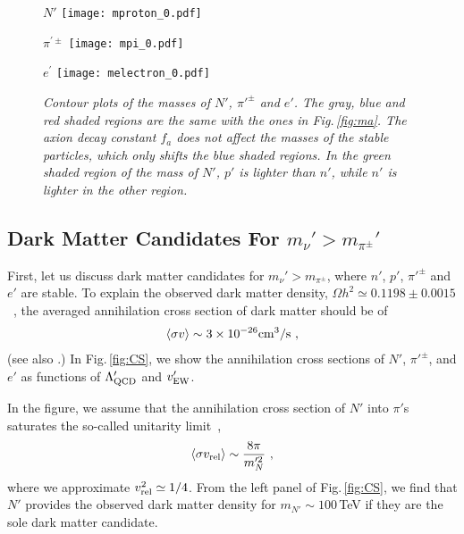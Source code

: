 \documentclass[aps,amsmath,preprint,epsf,superscriptaddress,nofootinbib,notitlepage]{revtex4-1}
\begin{document}
\begin{figure}[t]
\begin{center}
\begin{minipage}{.325\linewidth}
{\sl \small $N'$}  
\texttt{[image: mproton\_0.pdf]}
 \end{minipage}
 \begin{minipage}{.325\linewidth}
 {\sl \small $\pi^{\prime\pm}$}  
  \texttt{[image: mpi\_0.pdf]}
 \end{minipage}
  \begin{minipage}{.325\linewidth}
    {\sl \small $e^{\prime}$}  
  \texttt{[image: melectron\_0.pdf]}
 \end{minipage}
 \end{center}
\caption{\sl \small
Contour plots of the masses of $N'$, $\pi'^\pm$ and $e'$.
The gray, blue and red shaded regions are the same with the ones in Fig.\,\ref{fig:ma}.
The axion decay constant $f_a$ does not affect the masses of the stable particles,
 which only shifts the blue shaded regions. 
 In the green shaded region of the mass of $N'$, $p'$ is lighter than
 $n'$, while $n'$ is lighter in the other region.
}
\label{fig:masses}
\end{figure}

\subsection{Dark Matter Candidates For $m_\nu' > m_{\pi^\pm}'$}
First, let us discuss dark matter candidates for $m_\nu' > m_{\pi^\pm}$,
where $n'$, $p'$, $\pi'^\pm$ and $e'$ are stable.
To explain the observed dark matter density, 
$\Omega h^2 \simeq 0.1198\pm 0.0015$~\cite{Ade:2015lrj},
the averaged annihilation cross section of dark matter should be of 
\begin{eqnarray}
\label{eq:WIMP}
\left\langle {\sigma v} \right\rangle \sim 3\times 10^{-26} {\rm cm}^3/{\rm s}\ ,
\end{eqnarray}
\cite{Gondolo:1990dk} (see also \cite{Steigman:2012nb}.)
In Fig.\,\ref{fig:CS}, we show the annihilation cross sections of $N'$, $\pi'^\pm$, and $e'$
as functions of $\Lambda_{\rm QCD}'$ and $v_{\rm EW}'$.

In the figure, we assume that the annihilation cross section of $N'$ into $\pi'$s
saturates the so-called unitarity limit~\cite{Griest:1989wd},
\begin{eqnarray}
\left\langle {\sigma v_{\rm rel}} \right\rangle \sim \frac{8\pi}{m_{N}'^2} \ ,
\end{eqnarray}
where we approximate $v_{\rm rel}^2 \simeq 1/4$.
From the left panel of Fig.\,\ref{fig:CS}, we find that  $N'$ provides the observed dark matter 
density for $m_{N'} \sim 100$\,TeV if they are the sole dark matter candidate. 
\end{document}
